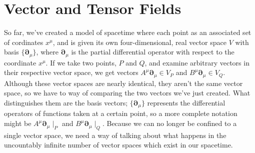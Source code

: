 \chapter{Vector and Tensor Fields}
So far, we've created a model of spacetime where each point as an associated set of cordinates $x^\mu$, and is given its own four-dimensional, real vector space $V$ with basis $\{\bm{\partial}_\mu\}$, where $\bm{\partial}_\mu$ is the partial differential operator with respect to the coordinate $x^\mu$.
If we take two points, $P$ and $Q$, and examine arbitrary vectors in their respective vector space, we get vectors $A^\mu \bm{\partial}_\mu \in V_P$ and $B^\mu \bm{\partial}_\mu \in V_Q$.
Although these vector spaces are nearly identical, they aren't the same vector space, so we have to way of comparing the two vectors we've just created.
What distinguishes them are the basis vectors; $\{\bm{\partial}_\mu\}$ represents the differential operators of functions taken at a certain point, so a more complete notation might be $A^\mu \bm{\partial}_\mu \mid_P$ and $B^\mu \bm{\partial}_\mu \mid_Q$.
Because we can no longer be confined to a single vector space, we need a way of talking about what happens in the uncountably infinite number of vector spaces which exist in our spacetime.

